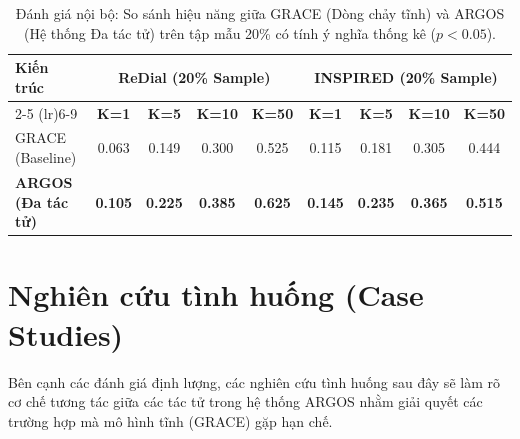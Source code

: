 \begin{table}[H]
    \caption{Đánh giá nội bộ: So sánh hiệu năng giữa GRACE (Dòng chảy tĩnh) và ARGOS (Hệ thống Đa tác tử) trên tập mẫu 20\% có tính ý nghĩa thống kê ($p < 0.05$).}
    \label{tab:argos_internal}
    \centering
    \begin{tabular}{lcccccccc}
        \toprule
        \multirow{2}{*}{\textbf{Kiến trúc}} & \multicolumn{4}{c}{\textbf{ReDial (20\% Sample)}} & \multicolumn{4}{c}{\textbf{INSPIRED (20\% Sample)}}                                                                   \\
        \cmidrule(lr){2-5} \cmidrule(lr){6-9}
                                            & \textbf{K=1}                                      & \textbf{K=5}                                        & \textbf{K=10}  & \textbf{K=50}
                                            & \textbf{K=1}                                      & \textbf{K=5}                                        & \textbf{K=10}  & \textbf{K=50}                                  \\
        \midrule
        GRACE (Baseline)                    & 0.063                                             & 0.149                                               & 0.300          & 0.525          & 0.115 & 0.181 & 0.305 & 0.444 \\
        \textbf{ARGOS (Đa tác tử)}          & \textbf{0.105}                                    & \textbf{0.225}                                      & \textbf{0.385} & \textbf{0.625}
                                            & \textbf{0.145}                                    & \textbf{0.235}                                      & \textbf{0.365} & \textbf{0.515}                                 \\
        \bottomrule
    \end{tabular}
\end{table}

\section{Nghiên cứu tình huống (Case Studies)}

Bên cạnh các đánh giá định lượng, các nghiên cứu tình huống sau đây sẽ làm rõ cơ chế tương tác giữa các tác tử trong hệ thống ARGOS nhằm giải quyết các trường hợp mà mô hình tĩnh (GRACE) gặp hạn chế.

